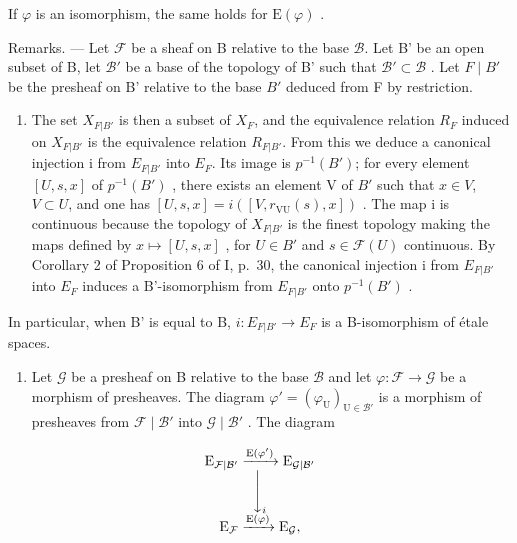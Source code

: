 If \(\varphi\) is an isomorphism, the same holds for \(\mathrm{E}(\varphi)\) .

Remarks. --- Let \(\mathcal{F}\) be a sheaf on B relative to the base \(\mathcal{B}\). Let B' be an open subset of B, let \(\mathcal{B}'\) be a base of the topology of B' such that \(\mathcal{B}' \subset \mathcal{B}\) . Let \(F \mid B'\) be the presheaf on B' relative to the base \(B'\) deduced from F by restriction.

\begin{enumerate}
\def\labelenumi{\arabic{enumi})}
\tightlist
\item
  The set \(X_{F|B'}\) is then a subset of \(X_{F}\), and the equivalence relation \(R_{F}\) induced on \(X_{F|B'}\) is the equivalence relation \(R_{F|B'}\). From this we deduce a canonical injection i from \(E_{F|B'}\) into \(E_{F}\). Its image is \(p^{-1}(B')\); for every element \([U, s, x]\) of \(p^{-1}(B')\) , there exists an element V of \(B'\) such that \(x \in V\), \(V \subset U\), and one has \([U, s, x] = i([V, r_{\mathrm{VU}}(s), x])\) . The map i is continuous because the topology of \(X_{F|B'}\) is the finest topology making the maps defined by \(x \mapsto [U, s, x]\) , for \(U \in B'\) and \(s \in \mathcal{F}(U)\) continuous. By Corollary 2 of Proposition 6 of I, p.~30, the canonical injection i from \(E_{F|B'}\) into \(E_{F}\) induces a B'-isomorphism from \(E_{F|B'}\) onto \(p^{-1}(B')\) .
\end{enumerate}

In particular, when B' is equal to B, \(i: E_{F|B'} \to E_F\) is a B-isomorphism of étale spaces.

\begin{enumerate}
\def\labelenumi{\arabic{enumi})}
\setcounter{enumi}{1}
\tightlist
\item
  Let \(\mathcal{G}\) be a presheaf on B relative to the base \(\mathcal{B}\) and let \(\varphi\colon\mathcal{F}\to\mathcal{G}\) be a morphism of presheaves. The diagram \(\varphi'=(\varphi_{\mathrm{U}})_{\mathrm{U}\in\mathcal{B}'}\) is a morphism of presheaves from \(\mathcal{F}\mid\mathcal{B}'\) into \(\mathcal{G}\mid\mathcal{B}'\) . The diagram
\end{enumerate}

\[
\begin{array}{c} \mathrm{E} _ {\mathcal {F} | \mathcal {B} ^ {\prime}} \xrightarrow {\mathrm{E} (\varphi^ {\prime})} \mathrm{E} _ {\mathcal {G} | \mathcal {B} ^ {\prime}} \\ \Biggl \downarrow_ {i} \\ \mathrm{E} _ {\mathcal {F}} \xrightarrow {\mathrm{E} (\varphi)} \mathrm{E} _ {\mathcal {G}}  , \end{array}
\]

